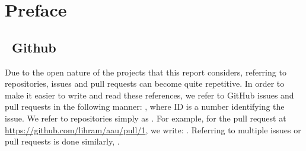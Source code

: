 \chapter*{Preface}

\section*{\faGithub~Github}
Due to the open nature of the projects that this report considers, referring to repositories, issues and pull requests can become quite repetitive.
In order to make it easier to write and read these references, we refer to GitHub issues and pull requests in the following manner: , where ID is a number identifying the issue.
We refer to repositories simply as .
For example, for the pull request at \url{https://github.com/lihram/aau/pull/1}, we write: .
Referring to multiple issues or pull requests is done similarly, .